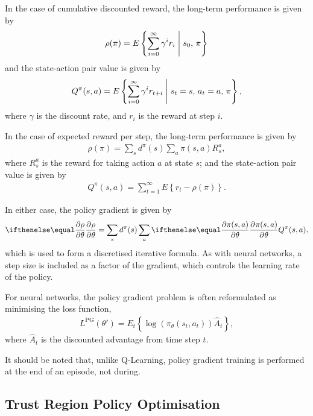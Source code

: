 In the case of cumulative discounted reward, the long-term performance is given
by
\begin{align*}
    \rho(\pi) = E\left\{
        \sum_{i=0}^{\infty} \gamma^{i}r_{i}
        \;\middle|\; s_0,\, \pi
    \right\}
\end{align*}
and the state-action pair value is given by
\begin{align*}
    Q^\pi(s,a) = E\left\{
        \sum_{i=0}^{\infty} \gamma^{i}r_{t+i}
        \;\middle|\; s_t=s,\, a_t=a,\, \pi
    \right\},
\end{align*}
where $\gamma$ is the discount rate, and $r_i$ is the reward at step $i$.

In the case of expected reward per step, the long-term performance is given by
\begin{align*}
    \rho(\pi) = \sum_s d^\pi(s) \sum_a \pi(s,a) R_s^a,
\end{align*}
where $R_s^a$ is the reward for taking action $a$ at state $s$;
and the state-action pair value is given by
\begin{align*}
    Q^\pi(s,a) = \sum_{t=1}^{\infty} E\left\{
        r_t - \rho(\pi)
    \right\}.
\end{align*}

In either case, the policy gradient is given by
\begin{align*}
    \Rpdiff{\rho}{\theta} =
    \sum_s d^\pi(s)
    \sum_a \Rpdiff{\pi(s,a)}{\theta}
    Q^\pi(s,a),
\end{align*}
which is used to form a discretised iterative formula.
As with neural networks, a step size is included as a factor of the
gradient, which controls the learning rate of the policy.

For neural networks, the policy gradient problem is often reformulated as
minimising the loss function,
\begin{align*}
    L^\text{PG}(\theta') = E_t\left\{
        \log(\pi_\theta(s_t,a_t))\hat{A}_t
    \right\},
\end{align*}
where $\hat{A}_t$ is the discounted advantage from time step $t$.

It should be noted that, unlike Q-Learning, policy gradient training is
performed at the end of an episode, not during.



\subsection{Trust Region Policy Optimisation}

